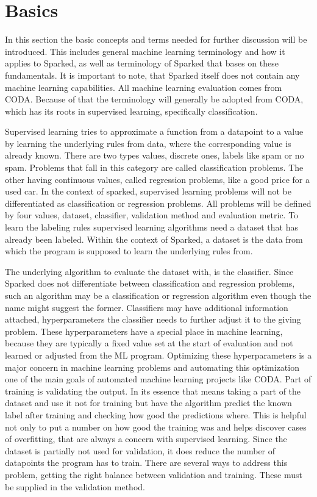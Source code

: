 \chapter{Basics}
In this section the basic concepts and terms needed for further discussion will be introduced. This includes general machine learning terminology and how it applies to Sparked, as well as terminology of Sparked that bases on these fundamentals. It is important to note, that Sparked itself does not contain any machine learning capabilities. All machine learning evaluation comes from CODA. Because of that the terminology will generally be adopted from CODA, which has its roots in supervised learning, specifically classification. 

Supervised learning tries to approximate a function from a datapoint to a value by learning the underlying rules from data, where the corresponding value is already known. There are two types values, discrete ones, labels like spam or no spam. Problems that fall in this category are called classification problems. The other having continuous values, called regression problems, like a good price for a used car. In the context of sparked, supervised learning problems will not be differentiated as classification or regression problems. All problems will be defined by four values, dataset, classifier, validation method and evaluation metric.
To learn the labeling rules supervised learning algorithms need a dataset that has already been labeled. Within the context of Sparked, a dataset is the data from which the program is supposed to learn the underlying rules from. 

The underlying algorithm to evaluate the dataset with, is the classifier. Since Sparked does not differentiate between classification and regression problems, such an algorithm may be a classification or regression algorithm even though the name might suggest the former. Classifiers may have additional information attached, hyperparameters the classifier needs to further adjust it to the giving problem. These hyperparameters have a special place in machine learning, because they are typically a fixed value set at the start of evaluation and not learned or adjusted from the ML program. Optimizing these hyperparameters is a major concern in machine learning problems and automating this optimization one of the main goals of automated machine learning projects like CODA.
Part of training is validating the output. In its essence that means taking a part of the dataset and use it not for training but have the algorithm predict the known label after training and checking how good the predictions where. This is helpful not only to put a number on how good the training was and helps discover cases of overfitting, that are always a concern with supervised learning. Since the dataset is partially not used for validation, it does reduce the number of datapoints the program has to train. There are several ways to address this problem, getting the right balance between validation and training. These must be supplied in the validation method.

